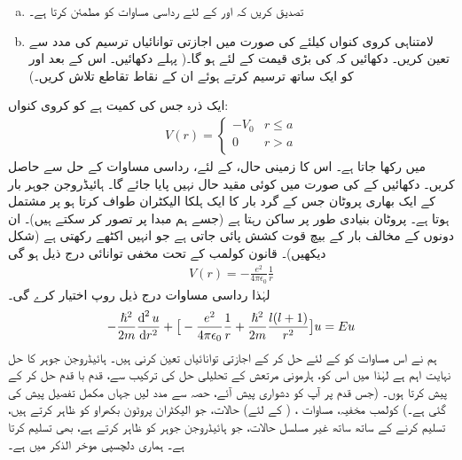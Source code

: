 %
\begin{enumerate}[a.]
\item
 تصدیق کریں کہ  اور  کے لئے  رداسی مساوات کو مطمئن کرتا ہے۔
\item
لامتناہی کروی کنواں کیلئے  کی صورت میں اجازتی توانائیاں ترسیم کی مدد سے تعین کریں۔ دکھائیں کہ  کی بڑی قیمت کے لئے 
 ہو گا۔( پہلے  
 دکھائیں۔ اس کے بعد  اور  کو ایک ساتھ ترسیم کرتے ہوئے ان کے نقاط تقاطع تلاش کریں۔)
\end{enumerate}
%
 ایک ذرہ جس کی کمیت  ہے کو  کروی کنواں:
\begin{align*}
V(r)=\begin{cases}-V_{0}&r\le a\\0&r>a\\\end{cases} 
\end{align*}
میں رکھا جاتا ہے۔ اس کا زمینی حال،   کے لئے،  رداسی مساوات کے حل سے حاصل کریں۔ دکھائیں کے
 کی صورت میں کوئی مقید حال نہیں پایا جائے گا۔
ہائیڈروجن جوہر بار  کے  ایک بھاری پروٹان جس کے گرد بار  کا ایک ہلکا الیکٹران طواف کرتا ہو پر مشتمل ہوتا ہے۔ پروٹان بنیادی طور پر ساکن رہتا ہے (جسے ہم مبدا پر تصور کر سکتے ہیں)۔  ان دونوں کے مخالف بار کے بیچ قوت کشش پائی جاتی ہے جو انہیں اکٹھے رکھتی ہے  (شکل  دیکھیں)۔  قانون کولمب کے تحت مخفی توانائی درج ذیل ہو گی  
 \begin{align}\label{مساوات_ابعادی_کولمب_مخفیہ}
V(r)=-\frac{e^{2}}{4\pi\epsilon_{0}}\frac{1}{r} 
\end{align}
لہٰذا رداسی مساوات  درج ذیل روپ اختیار کرے گی۔
\begin{align}\label{مساوات_ابعادی_رداسی_کولمب}
-\frac{\hslash^{2}}{2m}\frac{\dif^{\,2}{u}}{\dif r^{2}}+\big[-\frac{e^{2}}{4\pi\epsilon_{0}}\frac{1}{r}+\frac{\hslash^{2}}{2m}\frac{l(l+1)}{r^{2}}\big]u=Eu 
\end{align}
 ہم نے اس مساوات کو     کے لئے حل کر کے اجازتی توانائیاں  تعین کرنی ہیں۔  ہائیڈروجن جوہر کا حل نہایت اہم ہے لہٰذا میں اس کو، ہارمونی مرتعش کے تحلیلی حل کی ترکیب سے، قدم با قدم حل کر کے پیش کرتا ہوں۔ (جس قدم پر آپ کو دشواری پیش آئے، حصہ  سے مدد لیں جہاں مکمل تفصیل پیش کی گئی ہے۔)  کولمب مخفیہ، مساوات ،    ( کے لئے)   حالات، جو الیکٹران پروٹون بکھراو کو ظاہر کرتے ہیں، تسلیم کرنے کے ساتھ ساتھ غیر مسلسل  حالات، جو ہائیڈروجن جوہر کو ظاہر کرتے ہے، بھی تسلیم کرتا ہے۔ ہماری دلچسپی موخر الذکر میں ہے۔

